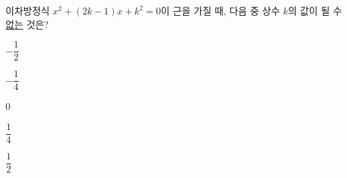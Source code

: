 이차방정식 $x^2+(2k-1)x+k^2=0$이 근을 가질 때, 다음 중 상수 $k$의 값이 될 수 \underline{없는} 것은?
\begin{choices32}{\rule[-3ex]{0pt}{8ex}$-\dfrac{1}{2}$}{\rule[-3ex]{0pt}{8ex}$-\dfrac{1}{4}$}{\rule[-3ex]{0pt}{8ex}$0$}{\rule[-3ex]{0pt}{8ex}$\dfrac{1}{4}$}{\rule[-3ex]{0pt}{8ex}$\dfrac{1}{2}$}\end{choices32}
